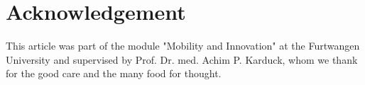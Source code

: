 \section{Acknowledgement}

This article was part of the module "Mobility and Innovation" at the Furtwangen University  and supervised by Prof. Dr. med. Achim P. Karduck, whom we thank for the good care and the many food for thought.
